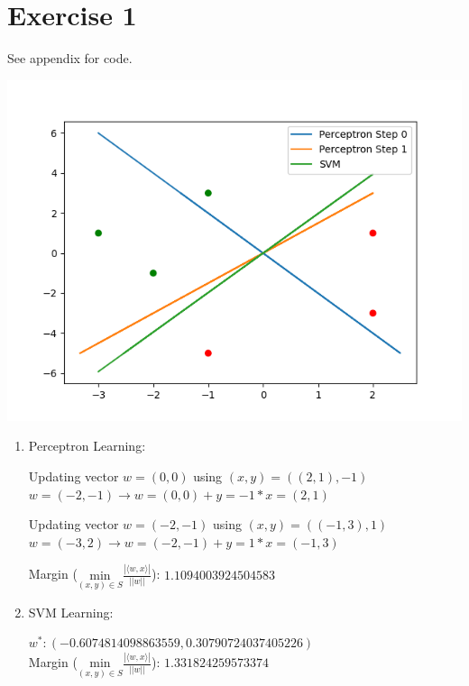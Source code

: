 \documentclass[12pt]{article}
\begin{document}
\section*{Exercise 1}
See \refname{appendix} for code.
\begin{center}
	\includegraphics{code/exercise_01.png}
\end{center}
\begin{enumerate}[label=(\alph*)]
	\item	Perceptron Learning: \\
			\bigskip

			Updating vector $w=(0, 0)$ using $(x,y)=((2, 1), -1)$ \\
			$w=(-2, -1) \rightarrow w=(0, 0) + y=-1 * x=(2, 1)$ \\
			\bigskip

			Updating vector $w=(-2, -1)$ using $(x,y)=((-1, 3), 1)$ \\
			$w=(-3, 2) \rightarrow w=(-2, -1) + y=1 * x=(-1, 3)$ \\
			\bigskip

			Margin ($\underset{(x,y)\in S}{\text{min}} \frac{|\langle w,x \rangle|}{|| w ||}$): $1.1094003924504583$
	\item	SVM Learning: \\
			\bigskip

			$w^*: (-0.6074814098863559, 0.30790724037405226)$ \\
			Margin ($\underset{(x,y)\in S}{\text{min}} \frac{|\langle w,x \rangle|}{|| w ||}$): $1.331824259573374$
\end{enumerate}
\end{document}
